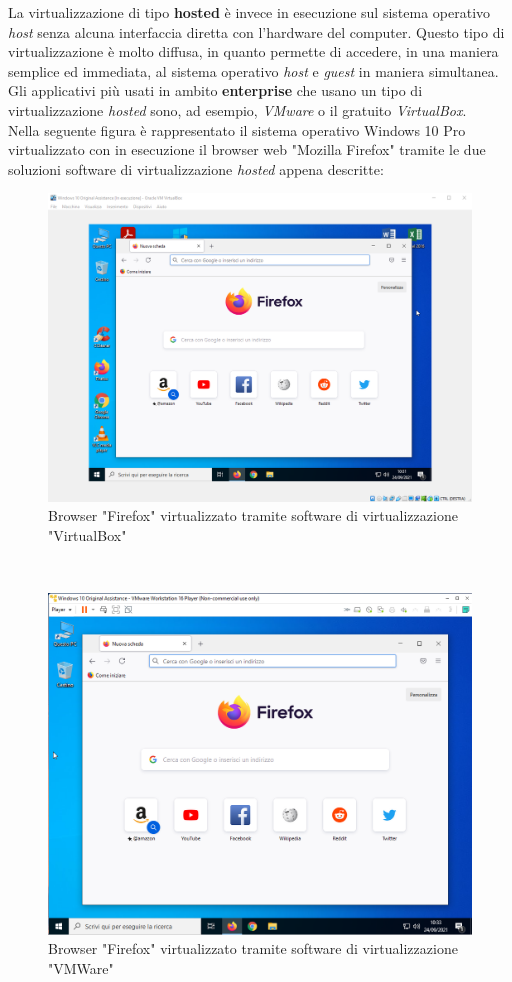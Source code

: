La virtualizzazione di tipo \textbf{hosted} è invece in esecuzione sul sistema operativo \textit{host} senza alcuna interfaccia diretta con l'hardware del computer. Questo tipo di virtualizzazione è molto diffusa, in quanto permette di accedere, in una maniera semplice ed immediata, al sistema operativo \textit{host} e \textit{guest} in maniera simultanea. Gli applicativi più usati in ambito \textbf{enterprise} che usano un tipo di virtualizzazione \textit{hosted} sono, ad esempio, \textit{VMware} o il gratuito \textit{VirtualBox}.\\
Nella seguente figura è rappresentato il sistema operativo Windows 10 Pro virtualizzato con in esecuzione il browser web "Mozilla Firefox" tramite le due soluzioni software di virtualizzazione \textit{hosted} appena descritte:
\begin{figure}[!h]     
\centering 
    \includegraphics[width=0.6\columnwidth]{immagini/screenshot/firefox_virtualbox} 
    \caption{Browser "Firefox" virtualizzato tramite software di virtualizzazione "VirtualBox"}
\end{figure} \\

\begin{figure}[!h]     
\centering 
    \includegraphics[width=0.6\columnwidth]{immagini/screenshot/firefox_vmware} 
    \caption{Browser "Firefox" virtualizzato tramite software di virtualizzazione "VMWare"}
\end{figure} \\

